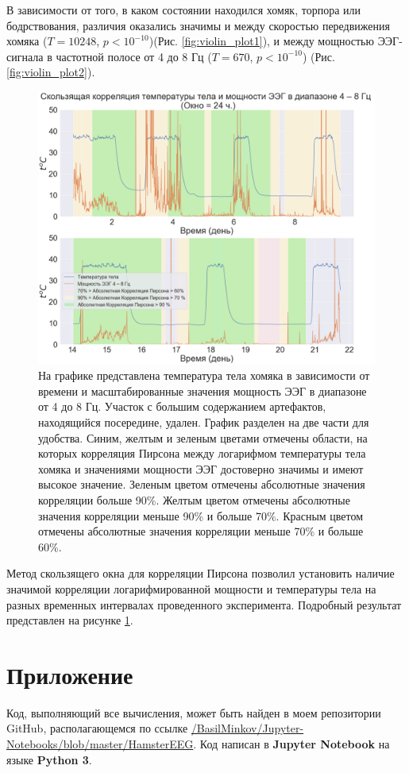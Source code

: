 \documentclass[12pt,a4paper,oneside]{article}
\begin{document}
В зависимости от того, в каком состоянии находился хомяк, торпора или бодрствования, различия оказались значимы и между скоростью передвижения хомяка ($T = 10248$, $p < 10^{-10}$)(Рис. \ref{fig:violin_plot1}), и между мощностью ЭЭГ-сигнала в частотной полосе от 4 до 8 Гц ($T = 670$, $p < 10^{-10}$) (Рис. \ref{fig:violin_plot2}). 

\begin{figure}[H]
\centering
\includegraphics[width=0.7\linewidth]{moving_correlation.png}
\caption{На графике представлена температура тела хомяка в зависимости от времени и масштабированные значения мощность ЭЭГ в диапазоне от 4 до 8 Гц. Участок с большим содержанием артефактов, находящийся посередине, удален. График разделен на две части для удобства. Синим, желтым и зеленым цветами отмечены области, на которых корреляция Пирсона между логарифмом температуры тела хомяка и значениями мощности ЭЭГ достоверно значимы и имеют высокое значение. Зеленым цветом отмечены абсолютные значения корреляции больше 90\%. Желтым цветом отмечены абсолютные значения корреляции меньше 90\% и больше 70\%. Красным цветом отмечены абсолютные значения корреляции меньше 70\% и больше 60\%. }\label{fig:moving_correlation}
\end{figure}

Метод скользящего окна для корреляции Пирсона позволил установить наличие значимой корреляции логарифмированной мощности и температуры тела на разных временных интервалах проведенного эксперимента. Подробный результат представлен на рисунке \ref{fig:moving_correlation}.

\section{Приложение}

Код, выполняющий все вычисления, может быть найден в моем репозитории GitHub, располагающемся по ссылке \href{https://github.com/BasilMinkov/Jupyter-Notebooks/blob/master/HamsterEEG.ipynb}{/BasilMinkov/Jupyter-Notebooks/blob/master/HamsterEEG}. Код написан в \textbf{Jupyter Notebook} на языке \textbf{Python 3}.



\end{document}
